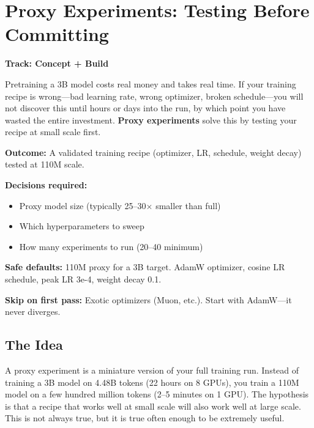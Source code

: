 \documentclass[11pt,a4paper]{article}
\begin{document}

\section{Proxy Experiments: Testing Before Committing}
\label{ch:proxy}

\begin{center}
\colorbox{lightaccent}{\textbf{Track: Concept + Build}}
\end{center}

Pretraining a 3B model costs real money and takes real time. If your training recipe is wrong---bad learning rate, wrong optimizer, broken schedule---you will not discover this until hours or days into the run, by which point you have wasted the entire investment. \textbf{Proxy experiments} solve this by testing your recipe at small scale first.

\begin{buildnow}
\textbf{Outcome:} A validated training recipe (optimizer, LR, schedule, weight decay) tested at 110M scale.

\textbf{Decisions required:}
\begin{itemize}[nosep]
  \item Proxy model size (typically 25--30$\times$ smaller than full)
  \item Which hyperparameters to sweep
  \item How many experiments to run (20--40 minimum)
\end{itemize}

\textbf{Safe defaults:} 110M proxy for a 3B target. AdamW optimizer, cosine LR schedule, peak LR 3e-4, weight decay 0.1.

\textbf{Skip on first pass:} Exotic optimizers (Muon, etc.). Start with AdamW---it never diverges.
\end{buildnow}

\subsection{The Idea}

A proxy experiment is a miniature version of your full training run. Instead of training a 3B model on 4.48B tokens (22 hours on 8 GPUs), you train a 110M model on a few hundred million tokens (2--5 minutes on 1 GPU). The hypothesis is that a recipe that works well at small scale will also work well at large scale. This is not always true, but it is true often enough to be extremely useful.
\end{document}

